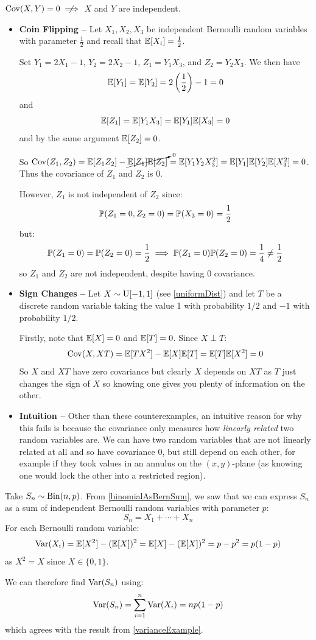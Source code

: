 \documentclass[../main.tex]{subfiles}
\begin{document}
\begin{remark}
  $\Cov(X, Y) = 0 \centernot \implies$ $X$ and $Y$ are independent. \label{covarianceCounterExample}
  \begin{itemize}
    \item \textbf{Coin Flipping --} Let $X_1, X_2, X_3$ be independent Bernoulli random variables with parameter $\frac{1}{2}$ and recall that $\E[X_i] = \frac{1}{2}$.

    Set $Y_1 = 2X_1 - 1$, $Y_2 = 2X_2 - 1$, $Z_1 = Y_1 X_3$, and $Z_2 = Y_2 X_3$.
    We then have
    \[
      \E[Y_1] = \E[Y_2] = 2\left(\frac{1}{2}\right) - 1 = 0
    \]
    and
    \[
      \E[Z_1] = \E[Y_1 X_3] = \E[Y_1]\E[X_3] = 0
    \]
    and by the same argument $\E[Z_2] = 0$.

    So $\Cov(Z_1, Z_2) = \E[Z_1Z_2] - \cancelto{0}{\E[Z_1]\E[Z_2]} = \E[Y_1 Y_2 X^2_3] = \E[Y_1]\E[Y_2]\E[X^2_3] = 0$.
    Thus the covariance of $Z_1$ and $Z_2$ is 0.

    However, $Z_1$ is not independent of $Z_2$ since:
    \[
      \P(Z_1 = 0, Z_2 = 0) = \P(X_3 = 0) = \frac{1}{2}
    \]
    but:
    \[
      \P(Z_1 = 0) = \P(Z_2 = 0) = \frac{1}{2} \implies \P(Z_1 = 0)\P(Z_2 = 0) = \frac{1}{4} \neq \frac{1}{2}
    \]
    so $Z_1$ and $Z_2$ are not independent, despite having 0 covariance.
  \item \textbf{Sign Changes --} Let $X \sim \uniform[-1, 1]$ (see \cref{uniformDist}) and let $T$ be a discrete random variable taking the value 1 with probability $1/2$ and $-1$ with probability $1/2$.

    Firstly, note that $\E[X] = 0$ and $\E[T] = 0$.
    Since $X \perp T$:
    \[
      \Cov(X, XT) = \E[TX^2] - \E[X]\E[T] = \E[T]\E[X^2] = 0
    \]
    So $X$ and $XT$ have zero covariance but clearly $X$ depends on $XT$ as $T$ just changes the sign of $X$ so knowing one gives you plenty of information on the other.
  \item \textbf{Intuition --} Other than these counterexamples, an intuitive reason for why this fails is because the covariance only measures how \textit{linearly related} two random variables are.
    We can have two random variables that are not linearly related at all and so have covariance 0, but still depend on each other, for example if they took values in an annulus on the $(x, y)$-plane (as knowing one would lock the other into a restricted region).
  \end{itemize}
\end{remark}
\begin{example}
  Take $S_n \sim \binomial(n, p)$.
  From \cref{binomialAsBernSum}, we saw that we can express $S_n$ as a sum of independent Bernoulli random variables with parameter $p$:
  \[
    S_n = X_1 + \cdots + X_n
  \]
  For each Bernoulli random variable:
  \[
    \Var(X_i) = \E[X^2] - (\E[X])^2 = \E[X] - (\E[X])^2 = p - p^2 = p(1 - p)
  \]
  as $X^2 = X$ since $X \in \{0, 1\}$.

  We can therefore find $\Var(S_n)$ using:
  \[
    \Var(S_n) = \sum_{i = 1}^{n} \Var(X_i) = np(1-p)
  \]
  which agrees with the result from \cref{varianceExample}.
\end{example}
\end{document}
